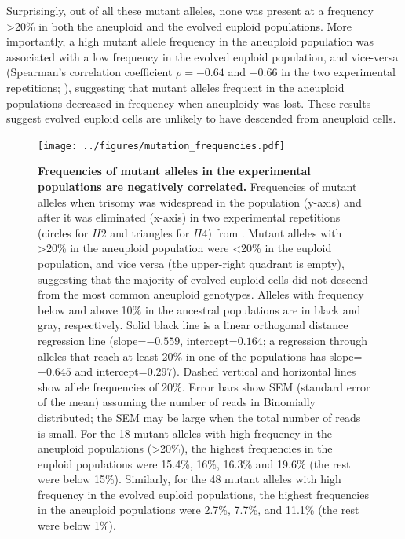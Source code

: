 \documentclass[12pt]{extarticle}
\begin{document}
Surprisingly, out of all these mutant alleles, none was present at a frequency >20\% in both the aneuploid and the evolved euploid populations. 
More importantly, a high mutant allele frequency in the aneuploid population was associated with a low frequency in the evolved euploid population, and vice-versa (Spearman's correlation coefficient $\rho=-0.64$ and $-0.66$ in the two experimental repetitions; ), suggesting that mutant alleles frequent in the aneuploid populations decreased in frequency when aneuploidy was lost.
These results suggest evolved euploid cells are unlikely to have descended from aneuploid cells.

\begin{figure}[h]
  \centering
    \texttt{[image: ../figures/mutation\_frequencies.pdf]}      
  \caption{
    \textbf{Frequencies of mutant alleles in the experimental populations are negatively correlated.} 
    Frequencies of mutant alleles when trisomy was widespread in the population (y-axis) and after it was eliminated (x-axis) in two experimental repetitions (circles for $H2$ and triangles for $H4$) from \citet{Yona2012}. Mutant alleles with >20\% in the aneuploid population were <20\% in the euploid population, and vice versa (the upper-right quadrant is empty), suggesting that the majority of evolved euploid cells did not descend from the most common aneuploid genotypes. 
Alleles with frequency below and above 10\% in the ancestral populations are in black and gray, respectively. 
Solid black line is a linear orthogonal distance regression line (slope=$-0.559$, intercept=$0.164$; a regression through alleles that reach at least 20\% in one of the populations has slope=$-0.645$ and intercept=$0.297$).
Dashed vertical and horizontal lines show allele frequencies of 20\%.
Error bars show SEM (standard error of the mean) assuming the number of reads in Binomially distributed; the SEM may be large when the total number of reads is small.
For the 18 mutant alleles with high frequency in the aneuploid populations (>20\%), the highest frequencies in the euploid populations were 15.4\%, 16\%, 16.3\% and 19.6\% (the rest were below 15\%).
Similarly, for the 48 mutant alleles with high frequency in the evolved euploid populations, the highest frequencies in the aneuploid populations were 2.7\%, 7.7\%, and 11.1\% (the rest were below 1\%). 
}
  \label{fig:mutation_frequencies}
\end{figure}

\end{document}
